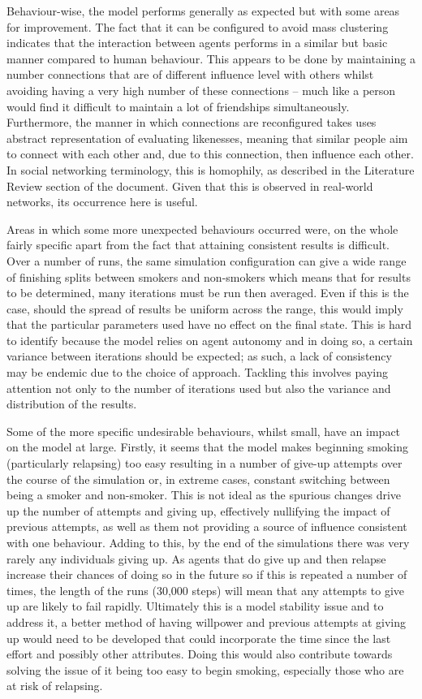 \documentclass[]{report}
\begin{document}
Behaviour-wise, the model performs generally as expected but with some areas for improvement. The fact that it can be configured to avoid mass clustering indicates that the interaction between agents performs in a similar but basic manner compared to human behaviour. This appears to be done by maintaining a number connections that are of different influence level with others whilst avoiding having a very high number of these connections – much like a person would find it difficult to maintain a lot of friendships simultaneously. Furthermore, the manner in which connections are reconfigured takes uses abstract representation of evaluating likenesses, meaning that similar people aim to connect with each other and, due to this connection, then influence each other. In social networking terminology, this is homophily, as described in the Literature Review section of the document. Given that this is observed in real-world networks, its occurrence here is useful.

Areas in which some more unexpected behaviours occurred were, on the whole fairly specific apart from the fact that attaining consistent results is difficult. Over a number of runs, the same simulation configuration can give a wide range of finishing splits between smokers and non-smokers which means that for results to be determined, many iterations must be run then averaged. Even if this is the case, should the spread of results be uniform across the range, this would imply that the particular parameters used have no effect on the final state. This is hard to identify because the model relies on agent autonomy and in doing so, a certain variance between iterations should be expected; as such, a lack of consistency may be endemic due to the choice of approach. Tackling this involves paying attention not only to the number of iterations used but also the variance and distribution of the results.

Some of the more specific undesirable behaviours, whilst small, have an impact on the model at large. Firstly, it seems that the model makes beginning smoking (particularly relapsing) too easy resulting in a number of give-up attempts over the course of the simulation or, in extreme cases, constant switching between being a smoker and non-smoker. This is not ideal as the spurious changes drive up the number of attempts and giving up, effectively nullifying the impact of previous attempts, as well as them not providing a source of influence consistent with one behaviour. Adding to this, by the end of the simulations there was very rarely any individuals giving up. As agents that do give up and then relapse increase their chances of doing so in the future so if this is repeated a number of times, the length of the runs (30,000 steps) will mean that any attempts to give up are likely to fail rapidly. Ultimately this is a model stability issue and to address it, a better method of having willpower and previous attempts at giving up would need to be developed that could incorporate the time since the last effort and possibly other attributes. Doing this would also contribute towards solving the issue of it being too easy to begin smoking, especially those who are at risk of relapsing.
\end{document}

